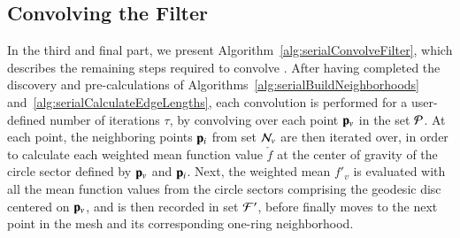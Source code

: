 %
%
\subsection{Convolving the Filter}
\label{ch5sSIssCF}
In the third and final part, we present Algorithm~\ref{alg:serialConvolveFilter}, which describes the remaining steps required to convolve . After having completed the discovery and pre-calculations of Algorithms~\ref{alg:serialBuildNeighborhoods} and~\ref{alg:serialCalculateEdgeLengths}, each convolution is performed for a user-defined number of iterations $\tau$, by convolving over each point $\mathbf{p}_v$ in the set $\mathcal{P}$. At each point, the neighboring points $\mathbf{p}_i$ from set $\mathcal{N}_v$ are then iterated over, in order to calculate each weighted mean function value $\check{f}$ at the center of gravity of the circle sector defined by $\mathbf{p}_v$ and $\mathbf{p}_i$. Next, the weighted mean $f'_v$ is evaluated with all the mean function values from the circle sectors comprising the geodesic disc centered on $\mathbf{p}_v$,  and is then recorded in set $\mathcal{F}'$, before  finally moves to the next point in the mesh and its corresponding one-ring neighborhood.

